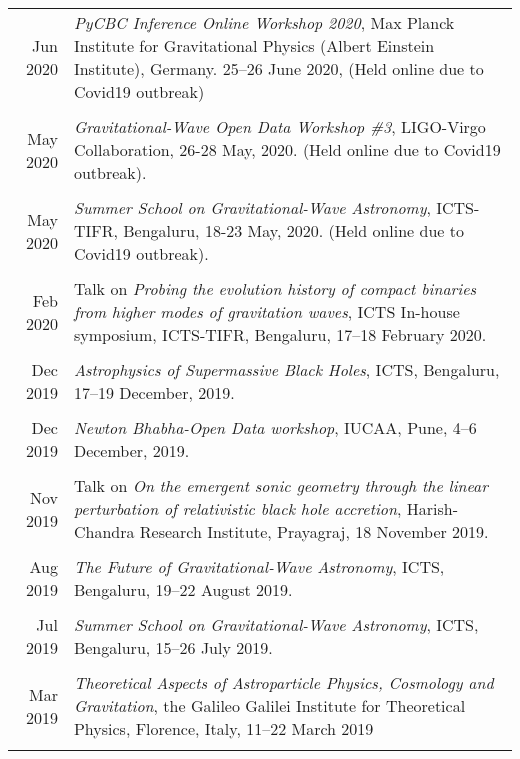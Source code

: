 \documentclass[12pt]{article}
\begin{document}
\begin{longtable}{rp{14cm}}
  Jun 2020 & {\itshape PyCBC Inference Online Workshop 2020}, Max Planck Institute for Gravitational Physics (Albert Einstein Institute), Germany. 25--26 June 2020, (Held online due to Covid19 outbreak)\\\\
  
  May 2020 & {\itshape Gravitational-Wave Open Data Workshop \#3}, LIGO-Virgo Collaboration, 26-28 May, 2020. (Held online due to Covid19 outbreak).\\\\
  
  May 2020 & {\itshape Summer School on Gravitational-Wave Astronomy}, ICTS-TIFR, Bengaluru, 18-23 May, 2020. (Held online due to Covid19 outbreak).\\\\
  
Feb 2020 & {Talk} on {\itshape Probing the evolution history of compact binaries from higher modes of gravitation waves}, ICTS In-house symposium, ICTS-TIFR, Bengaluru, 17–18 February 2020.\\\\ %

 Dec 2019 & {\itshape Astrophysics of Supermassive Black Holes}, ICTS, Bengaluru, 17–19 December, 2019.\\\\

 Dec 2019 & {\itshape Newton Bhabha-Open Data workshop}, IUCAA, Pune, 4–6 December, 2019.\\\\
  
 Nov 2019 & {Talk} on {\itshape On the emergent sonic geometry through the linear perturbation of relativistic black hole accretion}, Harish-Chandra Research Institute, Prayagraj, 18 November 2019.\\\\

Aug 2019 & {\itshape The Future of Gravitational-Wave Astronomy}, ICTS, Bengaluru, 19–22 August 2019.\\\\

Jul 2019 & {\itshape Summer School on Gravitational-Wave Astronomy}, ICTS, Bengaluru, 15–26 July 2019.\\\\

Mar 2019 & {\itshape Theoretical Aspects of Astroparticle Physics, Cosmology and Gravitation}, the Galileo Galilei Institute for Theoretical Physics, Florence, Italy, 11–22 March 2019\\\\
  

\end{longtable}
\end{document}
